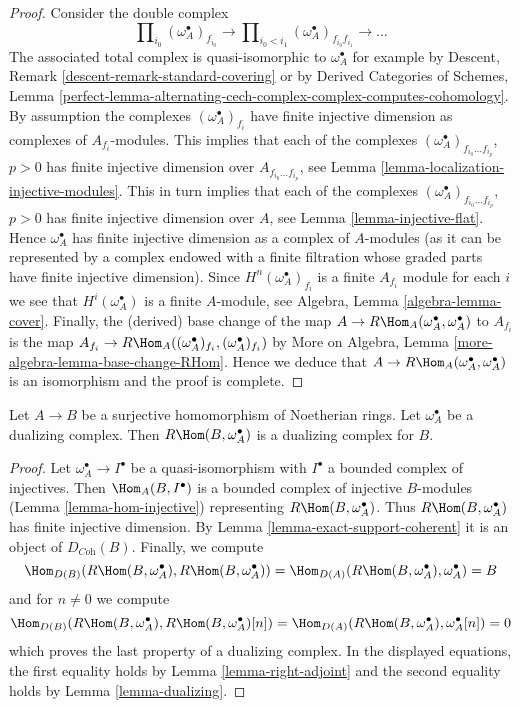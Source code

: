 \begin{proof}
Consider the double complex
$$
\prod\nolimits_{i_0} (\omega_A^\bullet)_{f_{i_0}}
\to
\prod\nolimits_{i_0 < i_1} (\omega_A^\bullet)_{f_{i_0}f_{i_1}}
\to \ldots
$$
The associated total complex is quasi-isomorphic to $\omega_A^\bullet$
for example by Descent, Remark \ref{descent-remark-standard-covering}
or by
Derived Categories of Schemes, Lemma
\ref{perfect-lemma-alternating-cech-complex-complex-computes-cohomology}.
By assumption the complexes $(\omega_A^\bullet)_{f_i}$ have
finite injective dimension as complexes of $A_{f_i}$-modules.
This implies that each of the complexes
$(\omega_A^\bullet)_{f_{i_0} \ldots f_{i_p}}$, $p > 0$ has
finite injective dimension over $A_{f_{i_0} \ldots f_{i_p}}$,
see Lemma \ref{lemma-localization-injective-modules}.
This in turn implies that each of the complexes
$(\omega_A^\bullet)_{f_{i_0} \ldots f_{i_p}}$, $p > 0$ has
finite injective dimension over $A$, see
Lemma \ref{lemma-injective-flat}. Hence $\omega_A^\bullet$
has finite injective dimension as a complex of $A$-modules
(as it can be represented by a complex endowed with
a finite filtration whose graded parts have finite injective
dimension). Since $H^n(\omega_A^\bullet)_{f_i}$ is a finite
$A_{f_i}$ module for each $i$ we see that $H^i(\omega_A^\bullet)$
is a finite $A$-module, see Algebra, Lemma \ref{algebra-lemma-cover}.
Finally, the (derived) base change of the map
$A \to R\Hom_A(\omega_A^\bullet, \omega_A^\bullet)$ to $A_{f_i}$
is the map
$A_{f_i} \to R\Hom_A((\omega_A^\bullet)_{f_i}, (\omega_A^\bullet)_{f_i})$ by
More on Algebra, Lemma \ref{more-algebra-lemma-base-change-RHom}.
Hence we deduce that
$A \to R\Hom_A(\omega_A^\bullet, \omega_A^\bullet)$
is an isomorphism and the proof is complete.
\end{proof}

\begin{lemma}
\label{lemma-dualizing-quotient}
Let $A \to B$ be a surjective homomorphism of Noetherian rings.
Let $\omega_A^\bullet$ be a dualizing complex.
Then $R\Hom(B, \omega_A^\bullet)$ is a dualizing complex for $B$.
\end{lemma}

\begin{proof}
Let $\omega_A^\bullet \to I^\bullet$ be a quasi-isomorphism
with $I^\bullet$ a bounded complex of injectives.
Then $\Hom_A(B, I^\bullet)$ is a bounded complex of injective
$B$-modules (Lemma \ref{lemma-hom-injective}) representing
$R\Hom(B, \omega_A^\bullet)$.
Thus $R\Hom(B, \omega_A^\bullet)$ has finite injective dimension.
By Lemma \ref{lemma-exact-support-coherent} it is an object of
$D_{\textit{Coh}}(B)$. Finally, we compute
$$
\Hom_{D(B)}(R\Hom(B, \omega_A^\bullet), R\Hom(B, \omega_A^\bullet)) =
\Hom_{D(A)}(R\Hom(B, \omega_A^\bullet), \omega_A^\bullet) = B
$$
and for $n \not = 0$ we compute
$$
\Hom_{D(B)}(R\Hom(B, \omega_A^\bullet), R\Hom(B, \omega_A^\bullet)[n]) =
\Hom_{D(A)}(R\Hom(B, \omega_A^\bullet), \omega_A^\bullet[n]) = 0
$$
which proves the last property of a dualizing complex.
In the displayed equations, the first
equality holds by Lemma \ref{lemma-right-adjoint}
and the second equality holds by Lemma \ref{lemma-dualizing}.
\end{proof}

